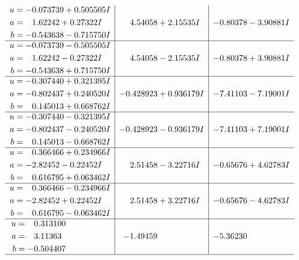 \documentclass[1p]{elsarticle_modified}
\theoremstyle{definition}
\begin{document}
$$\begin{array}{c|c|c}
\begin{aligned}
u &= -0.073739 + 0.505505 I \\
a &= \phantom{-}1.62242 + 0.27322 I \\
b &= -0.543638 - 0.715750 I\end{aligned}
 & \phantom{-}4.54058 + 2.15535 I & -0.80378 - 3.90881 I \\ \hline\begin{aligned}
u &= -0.073739 - 0.505505 I \\
a &= \phantom{-}1.62242 - 0.27322 I \\
b &= -0.543638 + 0.715750 I\end{aligned}
 & \phantom{-}4.54058 - 2.15535 I & -0.80378 + 3.90881 I \\ \hline\begin{aligned}
u &= -0.307440 + 0.321395 I \\
a &= -0.802437 + 0.240520 I \\
b &= \phantom{-}0.145013 + 0.668762 I\end{aligned}
 & -0.428923 + 0.936179 I & -7.41103 - 7.19001 I \\ \hline\begin{aligned}
u &= -0.307440 - 0.321395 I \\
a &= -0.802437 - 0.240520 I \\
b &= \phantom{-}0.145013 - 0.668762 I\end{aligned}
 & -0.428923 - 0.936179 I & -7.41103 + 7.19001 I \\ \hline\begin{aligned}
u &= \phantom{-}0.366466 + 0.234966 I \\
a &= -2.82452 - 0.22452 I \\
b &= \phantom{-}0.616795 + 0.063462 I\end{aligned}
 & \phantom{-}2.51458 - 3.22716 I & -0.65676 + 4.62783 I \\ \hline\begin{aligned}
u &= \phantom{-}0.366466 - 0.234966 I \\
a &= -2.82452 + 0.22452 I \\
b &= \phantom{-}0.616795 - 0.063462 I\end{aligned}
 & \phantom{-}2.51458 + 3.22716 I & -0.65676 - 4.62783 I \\ \hline\begin{aligned}
u &= \phantom{-}0.313100\phantom{ +0.000000I} \\
a &= \phantom{-}3.11363\phantom{ +0.000000I} \\
b &= -0.504407\phantom{ +0.000000I}\end{aligned}
 & -1.49459\phantom{ +0.000000I} & -5.36230\phantom{ +0.000000I}\\
 \hline 
 \end{array}$$\newpage\newpage\renewcommand{\arraystretch}{1}
\end{document}
